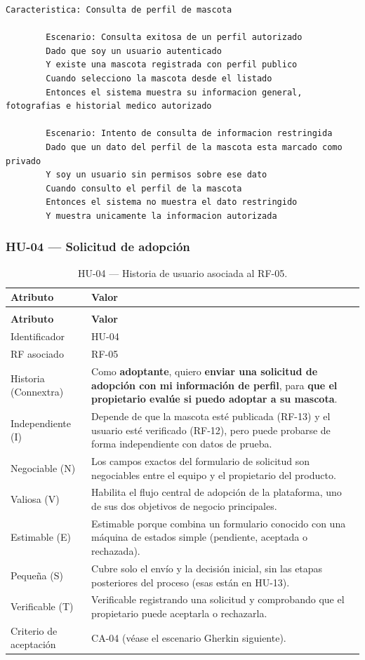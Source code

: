 \documentclass[journal,onecolumn]{IEEEtran}
\makeatletter
\newenvironment{atributos}[2]{%
	\small
	\begin{longtable}{@{}>{\raggedright\arraybackslash}p{4.2cm} >{\raggedright\arraybackslash}p{11.2cm}@{}}
		\caption{#2}\label{tab:#1}\\
		\toprule
		\textbf{Atributo} & \textbf{Valor} \\
		\midrule
		\endfirsthead
		\multicolumn{2}{@{}l}{\small\itshape (continuación)}\\
		\toprule
		\textbf{Atributo} & \textbf{Valor} \\
		\midrule
		\endhead
		\bottomrule
		\endlastfoot
	}{%
	\end{longtable}
	\normalsize
}
\makeatother
\begin{document}
	\begin{lstlisting}[style=gherkin,caption={CA-03 --- Escenario de aceptación de la historia HU-03.},label={lst:ca03}]
		Caracteristica: Consulta de perfil de mascota
		
		Escenario: Consulta exitosa de un perfil autorizado
		Dado que soy un usuario autenticado
		Y existe una mascota registrada con perfil publico
		Cuando selecciono la mascota desde el listado
		Entonces el sistema muestra su informacion general, fotografias e historial medico autorizado
		
		Escenario: Intento de consulta de informacion restringida
		Dado que un dato del perfil de la mascota esta marcado como privado
		Y soy un usuario sin permisos sobre ese dato
		Cuando consulto el perfil de la mascota
		Entonces el sistema no muestra el dato restringido
		Y muestra unicamente la informacion autorizada
	\end{lstlisting}
	
	\subsubsection{HU-04 --- Solicitud de adopción}
	
	\begin{atributos}{HU-04}{HU-04 --- Historia de usuario asociada al RF-05.}
		Identificador & HU-04 \\
		RF asociado & RF-05 \\
		Historia (Connextra) & Como \textbf{adoptante}, quiero \textbf{enviar una solicitud de adopción con mi información de perfil}, para \textbf{que el propietario evalúe si puedo adoptar a su mascota}. \\
		Independiente (I) & Depende de que la mascota esté publicada (RF-13) y el usuario esté verificado (RF-12), pero puede probarse de forma independiente con datos de prueba. \\
		Negociable (N) & Los campos exactos del formulario de solicitud son negociables entre el equipo y el propietario del producto. \\
		Valiosa (V) & Habilita el flujo central de adopción de la plataforma, uno de sus dos objetivos de negocio principales. \\
		Estimable (E) & Estimable porque combina un formulario conocido con una máquina de estados simple (pendiente, aceptada o rechazada). \\
		Pequeña (S) & Cubre solo el envío y la decisión inicial, sin las etapas posteriores del proceso (esas están en HU-13). \\
		Verificable (T) & Verificable registrando una solicitud y comprobando que el propietario puede aceptarla o rechazarla. \\
		Criterio de aceptación & CA-04 (véase el escenario Gherkin siguiente). \\
	\end{atributos}
	
\end{document}
